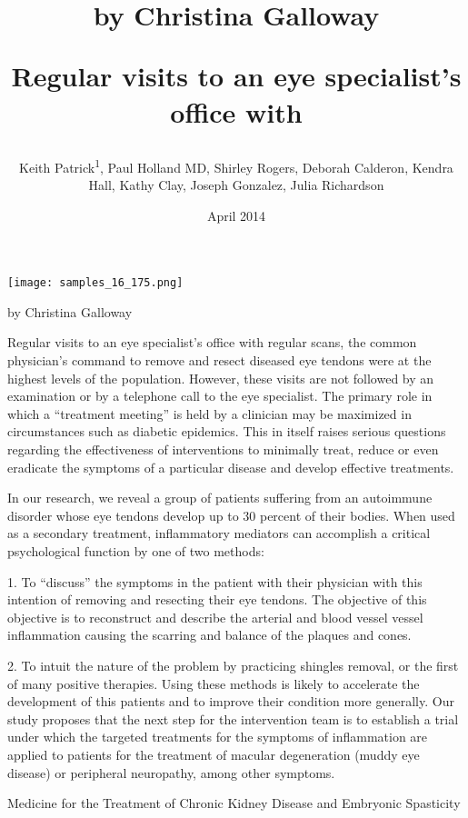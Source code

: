\documentclass{article}
\title{by Christina Galloway

Regular visits to an eye specialist’s office with}
\author{Keith Patrick\textsuperscript{1},  Paul Holland MD,  Shirley Rogers,  Deborah Calderon,  Kendra Hall,  Kathy Clay,  Joseph Gonzalez,  Julia Richardson}
\affil{\textsuperscript{1}Kobe University}
\date{April 2014}
\begin{document}
\maketitle

\begin{center}
\begin{minipage}{0.75\linewidth}
\texttt{[image: samples\_16\_175.png]}
\end{minipage}
\end{center}

by Christina Galloway

Regular visits to an eye specialist’s office with regular scans, the common physician’s command to remove and resect diseased eye tendons were at the highest levels of the population. However, these visits are not followed by an examination or by a telephone call to the eye specialist. The primary role in which a “treatment meeting” is held by a clinician may be maximized in circumstances such as diabetic epidemics. This in itself raises serious questions regarding the effectiveness of interventions to minimally treat, reduce or even eradicate the symptoms of a particular disease and develop effective treatments.

In our research, we reveal a group of patients suffering from an autoimmune disorder whose eye tendons develop up to 30 percent of their bodies. When used as a secondary treatment, inflammatory mediators can accomplish a critical psychological function by one of two methods:

1. To “discuss” the symptoms in the patient with their physician with this intention of removing and resecting their eye tendons. The objective of this objective is to reconstruct and describe the arterial and blood vessel vessel inflammation causing the scarring and balance of the plaques and cones.

2. To intuit the nature of the problem by practicing shingles removal, or the first of many positive therapies. Using these methods is likely to accelerate the development of this patients and to improve their condition more generally. Our study proposes that the next step for the intervention team is to establish a trial under which the targeted treatments for the symptoms of inflammation are applied to patients for the treatment of macular degeneration (muddy eye disease) or peripheral neuropathy, among other symptoms.

Medicine for the Treatment of Chronic Kidney Disease and Embryonic Spasticity
\end{document}

